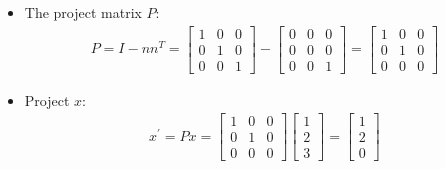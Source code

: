 \begin{frame}{}
\begin{itemize}
     \item The project matrix $P$: 
     \begin{align*}
         P = I -nn^T = \begin{bmatrix}
             1&0&0\\
             0&1&0\\
             0&0&1
         \end{bmatrix} - \begin{bmatrix}
                0 &0& 0\\
                0&0& 0\\
                0&0&1
            \end{bmatrix}= \begin{bmatrix}
                1 & 0 & 0\\
                0& 1& 0 \\
                0& 0& 0
            \end{bmatrix}
     \end{align*}
     \item Project $x$:
     \begin{align*}
         x^{'} = Px = \begin{bmatrix}
                1 & 0 & 0\\
                0& 1& 0 \\
                0& 0& 0
            \end{bmatrix}\begin{bmatrix}
                1\\2\\3
            \end{bmatrix} = \begin{bmatrix}
                1\\2\\0
            \end{bmatrix}
     \end{align*}
\end{itemize}
\end{frame}